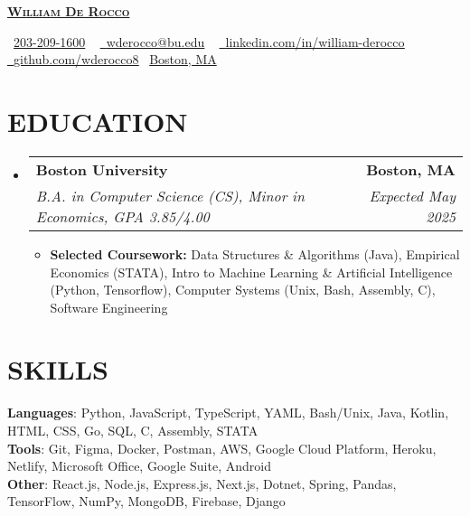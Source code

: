 \documentclass[letterpaper,11pt]{article}
\makeatletter
\newcommand{\resumeItem}[1]{
  \item\small{
    {#1 \vspace{-3pt}}
  }
}
\newcommand{\resumeSubheading}[4]{
  \vspace{-3pt}\item
    \begin{tabular*}{1.0\textwidth}[t]{l@{\extracolsep{\fill}}r}
      \textbf{#1} & \textbf{\small #2} \\
      \textit{\small#3} & \textit{\small #4} \\
    \end{tabular*}\vspace{-7pt}
}
\newcommand{\resumeSubHeadingListStart}{\begin{itemize}[leftmargin=0.0in, label={}]}
\newcommand{\resumeSubHeadingListEnd}{\end{itemize}}
\newcommand{\resumeItemListStart}{\begin{itemize}}
\newcommand{\resumeItemListEnd}
{\end{itemize}\vspace{0pt}}
\makeatother
\begin{document}
    \begin{center}
        {\huge \scshape \textbf{\href{https://cs-people.bu.edu/wderocco/}{William De Rocco }}}
        
        \small
        \raisebox{-0.2\height}\faPhone\  \underline{203-209-1600} ~ 
        \href{mailto:wderocco@bu.edu}{\raisebox{-0.2\height}\faEnvelope\  \underline{wderocco@bu.edu}} ~ 
        \href{https://www.linkedin.com/in/william-derocco/}{\raisebox{-0.2\height}\faLinkedin\ \underline{linkedin.com/in/william-derocco}}  ~
        \href{https://www.github.com/wderocco8}{\raisebox{-0.2\height}\faGithub\ \underline{github.com/wderocco8}}
        \raisebox{-0.2\height}\faMapPin \ \underline{Boston, MA}
    \end{center}

\section{EDUCATION}
  \resumeSubHeadingListStart
  
    \resumeSubheading
    {Boston University}{Boston, MA}
    {B.A.  in Computer Science (CS), Minor in Economics, GPA 3.85/4.00}{Expected May 2025}
        \resumeItemListStart
            \resumeItem{\textbf{Selected Coursework:} Data Structures \& Algorithms (Java), Empirical Economics (STATA), Intro to Machine Learning \& Artificial Intelligence (Python, Tensorflow), Computer Systems (Unix, Bash, Assembly, C), Software Engineering}
        \resumeItemListEnd
        
  \resumeSubHeadingListEnd

\section{SKILLS}

    \vspace{-7pt}
    \begin{itemize}
    [leftmargin=0.15in, label={}]\small{\item{
        \textbf{Languages}{: Python, JavaScript, TypeScript, YAML, Bash/Unix, Java, Kotlin, HTML, CSS, Go, SQL, C, Assembly, STATA} \\
        \textbf{Tools}{: Git, Figma, Docker, Postman, AWS, Google Cloud Platform, Heroku, Netlify, Microsoft Office, Google Suite, Android} \\
        \textbf{Other}{: React.js, Node.js, Express.js, Next.js, Dotnet, Spring, Pandas, TensorFlow, NumPy, MongoDB, Firebase, Django} \\}}
    \end{itemize}
\end{document}
